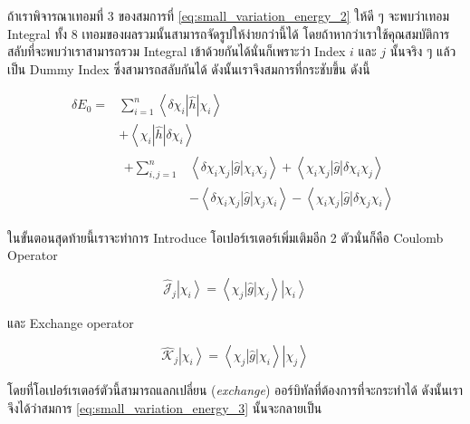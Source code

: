 \noindent ถ้าเราพิจารณาเทอมที่ 3 ของสมการที่ \eqref{eq:small_variation_energy_2} ให้ดี ๆ จะพบว่าเทอม Integral ทั้ง 8
เทอมของผลรวมนั้นสามารถจัดรูปให้ง่ายกว่านี้ได้ โดยถ้าหากว่าเราใช้คุณสมบัติการสลับที่จะพบว่าเราสามารถรวม Integral เข้าด้วยกันได้นั่นก็เพราะว่า
Index $i$ และ $j$ นั้นจริง ๆ แล้วเป็น Dummy Index ซึ่งสามารถสลับกันได้ ดังนั้นเราจึงสมการที่กระชับขึ้น ดังนี้

\begin{equation}
    \label{eq:small_variation_energy_3}
    \begin{aligned}
        \delta E_0
        = & \sum_{i=1}^n\left\langle\delta \chi_i|\hat{h}| \chi_i\right\rangle       \\
          & +\left\langle\chi_i|\hat{h}| \delta \chi_i\right\rangle                  \\
          & \begin{aligned} +\sum_{i, j=1}^n
                 & \left\langle \delta \chi_i \chi_j|\hat{g}| \chi_i \chi_j\right\rangle
                +\left\langle\chi_i \chi_j|\hat{g}| \delta \chi_i \chi_j\right\rangle    \\
                 & -\left\langle\delta \chi_i \chi_j|\hat{g}| \chi_j \chi_i\right\rangle
                -\left\langle\chi_i \chi_j|\hat{g}| \delta \chi_j \chi_i\right\rangle
            \end{aligned}
    \end{aligned}
\end{equation}

ในขั้นตอนสุดท้ายนี้เราจะทำการ Introduce โอเปอร์เรเตอร์เพิ่มเติมอีก 2 ตัวนั่นก็คือ Coulomb Operator

\begin{equation}
    \label{eq:coulomb_operator}
    \hat{\mathscr{J}}_j\left|\chi_i\right\rangle
    = \left\langle\chi_j|\hat{g}| \chi_j\right\rangle
    \left|\chi_i\right\rangle
\end{equation}

\noindent และ Exchange operator

\begin{equation}
    \label{eq:exchange_operator}
    \hat{\mathscr{K}}_j\left|\chi_i\right\rangle
    = \left\langle\chi_j|\hat{g}| \chi_i\right\rangle
    \left|\chi_j\right\rangle
\end{equation}

\noindent โดยที่โอเปอร์เรเตอร์ตัวนี้สามารถแลกเปลี่ยน (\textit{exchange}) ออร์บิทัลที่ต้องการที่จะกระทำได้ ดังนั้นเราจึงได้ว่าสมการ
\eqref{eq:small_variation_energy_3} นั้นจะกลายเป็น

